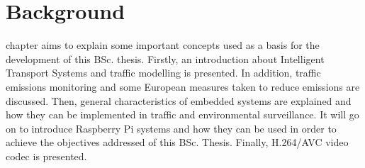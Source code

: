 
\chapter{Background}
\label{chap:background}

 chapter aims to explain some important concepts used as a basis for the development of this \ac{BSc.} thesis. Firstly, an introduction about Intelligent Transport Systems and traffic modelling is presented. In addition, traffic emissions monitoring and some European measures taken to reduce emissions are discussed. Then, general characteristics of embedded systems are explained and how they can be implemented in traffic and environmental surveillance. It will go on to introduce Raspberry Pi systems and how they can be used in order to achieve the objectives addressed of this \ac{BSc.} Thesis. Finally, H.264/AVC video codec is presented.

